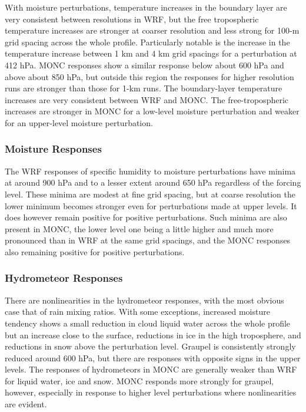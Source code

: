 \documentclass[draft]{agujournal2019}
\begin{document}
With moisture perturbations, temperature increases in the boundary layer are
very consistent between resolutions in WRF, but the free tropospheric
temperature increases are stronger at coarser resolution and less strong for
100-m grid spacing across the whole profile. Particularly notable is the
increase in the temperature increase between 1 km and 4 km grid spacings for a
perturbation at 412 hPa. MONC responses show a similar response below about 600
hPa and above about 850 hPa, but outside this region the responses for higher
resolution runs are stronger than those for 1-km runs. The boundary-layer
temperature increases are very consistent between WRF and MONC. The
free-tropospheric increases are stronger in MONC for a low-level moisture
perturbation and weaker for an upper-level moisture perturbation.

\subsubsection{Moisture Responses}

The WRF responses of specific humidity to moisture perturbations have minima at
around 900 hPa and to a lesser extent around 650 hPa regardless of the forcing
level. These minima are modest at fine grid spacing, but at coarse resolution
the lower minimum becomes stronger even for perturbations made at upper levels.
It does however remain positive for positive perturbations. Such minima are also
present in MONC, the lower level one being a little higher and much more
pronounced than in WRF at the same grid spacings, and the MONC responses also
remaining positive for positive perturbations.

\subsubsection{Hydrometeor Responses}

There are nonlinearities in the hydrometeor responses, with the most obvious
case that of rain mixing ratios. With some exceptions, increased moisture
tendency shows a small reduction in cloud liquid water across the whole profile
but an increase close to the surface, reductions in ice in the high troposphere,
and reductions in snow above the perturbation level. Graupel is consistently
strongly reduced around 600 hPa, but there are responses with opposite signs in
the upper levels. The responses of hydrometeors in MONC are generally weaker
than WRF for liquid water, ice and snow. MONC responds more strongly for
graupel, however, especially in response to higher level perturbations where
nonlinearities are evident.
\end{document}
